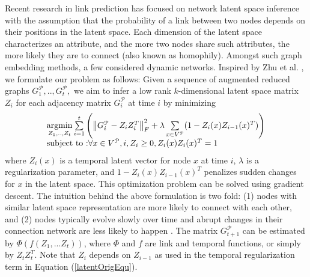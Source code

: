 Recent research in link prediction has focused on network latent space inference  \cite{Zhu2016,ye2013predicting,qi2013link,dunlavy2011temporal,menon2011link} with the assumption that the probability of a link between two nodes depends on their positions in the latent space. Each dimension of the latent space characterizes an attribute, and the more two nodes share such attributes, the more likely they are to connect (also known as homophily). Amongst such graph embedding methods, a few  \cite{dunlavy2011temporal,Zhu2016} considered dynamic networks. Inspired by %
Zhu et al. \cite{Zhu2016}%
, we formulate our problem as follows: Given a sequence of augmented reduced graphs $G^\mathcal{P}_1, .., G^\mathcal{P}_t,$ we aim to infer a low rank $k$-dimensional latent space matrix $Z_i$ for each adjacency matrix $G^\mathcal{P}_i$ at time $i$ by minimizing 
\begin{equation}\label{latentOrigEqu}
    \begin{array}{l}
\operatorname*{argmin}\limits_{Z_1, .., Z_t}\sum\limits_{i=1}^{t}\left(\left \| G^\mathcal{P}_i-Z_{i}Z_{i}^T \right \|^2_F+\lambda \sum\limits_{x \in V^\mathcal{P}}(1-Z_{i}(x)Z_{i-1}(x)^T) \right)
\\
\text{subject to :} \forall x \in V^\mathcal{P},i,Z_{i}\geq 0, Z_{i}(x)Z_{i}(x)^T=1
    \end{array}
\end{equation}
where $Z_i(x)$ is a temporal latent vector for node $x$ at time $i$, %
$\lambda$ is a regularization parameter, and $1-Z_{i}(x)Z_{i-1}(x)^T$ penalizes sudden changes for $x$ in the latent space. This optimization problem can be solved using gradient descent. The intuition behind the above formulation is two fold: (1) nodes with similar latent space representation are more likely to connect with each other, and (2) nodes typically evolve slowly over time and abrupt changes in their connection network are less likely to happen \cite{zhang2014inferring}. 
The matrix $G^\mathcal{P}_{t+1}$ can be estimated by $\Phi(f(Z_1,...Z_t))$, where $\Phi$ and $f$ are link and temporal functions, or simply by $Z_tZ_t^T$. Note that $Z_i$ depends on $Z_{i-1}$ as used in the temporal regularization term in Equation (\ref{latentOrigEqu}).


